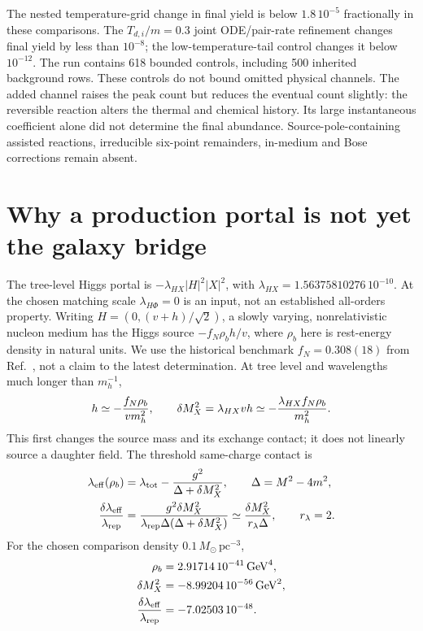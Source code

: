 \documentclass[11pt]{article}
\begin{document}
The nested temperature-grid change in final yield is below
$1.8\,10^{-5}$ fractionally in these comparisons. The $T_{d,i}/m=0.3$
joint ODE/pair-rate refinement changes final yield by less than $10^{-8}$;
the low-temperature-tail control changes it below $10^{-12}$. The run
contains 618 bounded controls, including 500 inherited background rows.
These controls do not bound omitted physical channels.
The added channel raises the peak count but reduces the eventual count
slightly: the reversible reaction alters the thermal and chemical history.
Its large instantaneous coefficient alone did not determine the final
abundance. Source-pole-containing assisted reactions, irreducible
six-point remainders, in-medium and Bose corrections remain absent.

\section{Why a production portal is not yet the galaxy bridge}
The tree-level Higgs portal is
$-\lambda_{HX}|H|^2|X|^2$, with
$\lambda_{HX}=1.56375810276\,10^{-10}$. At the chosen matching scale
$\lambda_{H\Phi}=0$ is an input, not an established all-orders property.
Writing $H=(0,(v+h)/\sqrt2)$, a slowly varying, nonrelativistic nucleon
medium has the Higgs source $-f_N\rho_b h/v$, where $\rho_b$ here is
rest-energy density in natural units. We use the historical benchmark
$f_N=0.308(18)$ from Ref.~\cite{ag:hoferichter}, not a claim to the latest
determination. At tree level and wavelengths much longer than $m_h^{-1}$,
\begin{equation}
 h\simeq-{f_N\rho_b\over v m_h^2},\qquad
 \delta M_X^2=\lambda_{HX}vh
            \simeq-{\lambda_{HX}f_N\rho_b\over m_h^2}.
 \label{ag:higgsresponse}
\end{equation}
This first changes the source mass and its exchange contact; it does not
linearly source a daughter field. The threshold same-charge contact is
\begin{align}
 \lambda_{\rm eff}(\rho_b)&=\lambda_{\rm tot}
                    -{g^2\over\Delta+\delta M_X^2},
       \qquad \Delta=M^2-4m^2,\\
 {\delta\lambda_{\rm eff}\over\lambda_{\rm rep}}
   &= {g^2\delta M_X^2\over
            \lambda_{\rm rep}\Delta(\Delta+\delta M_X^2)}
     \simeq {\delta M_X^2\over r_\lambda\Delta},
       \qquad r_\lambda=2.
\end{align}
For the chosen comparison density $0.1\,M_\odot\,\mathrm{pc}^{-3}$,
\begin{align}
 \rho_b&=2.91714\,10^{-41}\,\mathrm{GeV}^4,\\
 \delta M_X^2&=-8.99204\,10^{-56}\,\mathrm{GeV}^2,\\
 {\delta\lambda_{\rm eff}\over\lambda_{\rm rep}}
   &=-7.02503\,10^{-48}.
\end{align}
\end{document}

